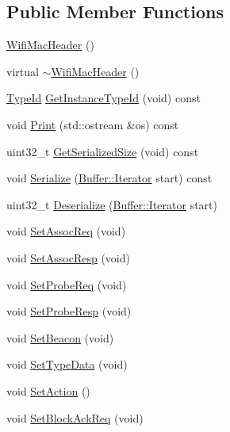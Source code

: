 \subsection*{Public Member Functions}
\begin{DoxyCompactItemize}
\item 
\hyperlink{classns3_1_1WifiMacHeader_aceeb201af18726243fdcf44bc58853e0}{Wifi\+Mac\+Header} ()
\item 
virtual \hyperlink{classns3_1_1WifiMacHeader_ae5df194f7e3f771498649a2c15877af2}{$\sim$\+Wifi\+Mac\+Header} ()
\item 
\hyperlink{classns3_1_1TypeId}{Type\+Id} \hyperlink{classns3_1_1WifiMacHeader_a70d229493b89eb3fe7cfb3ab1c43c3b8}{Get\+Instance\+Type\+Id} (void) const 
\item 
void \hyperlink{classns3_1_1WifiMacHeader_a60bf6ea3e112be8a46ac6fea40c322ab}{Print} (std\+::ostream \&os) const 
\item 
uint32\+\_\+t \hyperlink{classns3_1_1WifiMacHeader_a8da20d75301616ff677063a791a6c76a}{Get\+Serialized\+Size} (void) const 
\item 
void \hyperlink{classns3_1_1WifiMacHeader_aa2fe3c343432473fe066a15f91b1470f}{Serialize} (\hyperlink{classns3_1_1Buffer_1_1Iterator}{Buffer\+::\+Iterator} start) const 
\item 
uint32\+\_\+t \hyperlink{classns3_1_1WifiMacHeader_a90d4600f2911842469f6dad74cbd17e0}{Deserialize} (\hyperlink{classns3_1_1Buffer_1_1Iterator}{Buffer\+::\+Iterator} start)
\item 
void \hyperlink{classns3_1_1WifiMacHeader_a7460fb125d87a6751e2e045805735c55}{Set\+Assoc\+Req} (void)
\item 
void \hyperlink{classns3_1_1WifiMacHeader_a3c03f58d21b170c92abfcc5f677bf588}{Set\+Assoc\+Resp} (void)
\item 
void \hyperlink{classns3_1_1WifiMacHeader_abf205b85ff3b5387206c32170ab64d73}{Set\+Probe\+Req} (void)
\item 
void \hyperlink{classns3_1_1WifiMacHeader_a330c02480e29d3e6460665c0e3806934}{Set\+Probe\+Resp} (void)
\item 
void \hyperlink{classns3_1_1WifiMacHeader_a4a4f6db6199afc53ccc642617f1d2c63}{Set\+Beacon} (void)
\item 
void \hyperlink{classns3_1_1WifiMacHeader_a8bc4915d867ea16df7c110a87c534c27}{Set\+Type\+Data} (void)
\item 
void \hyperlink{classns3_1_1WifiMacHeader_a71238ec5b36713706b81fbec818a7e4b}{Set\+Action} ()
\item 
void \hyperlink{classns3_1_1WifiMacHeader_a76f0f508a7540348d147410e55ebb4d0}{Set\+Block\+Ack\+Req} (void)

\end{DoxyCompactItemize}
